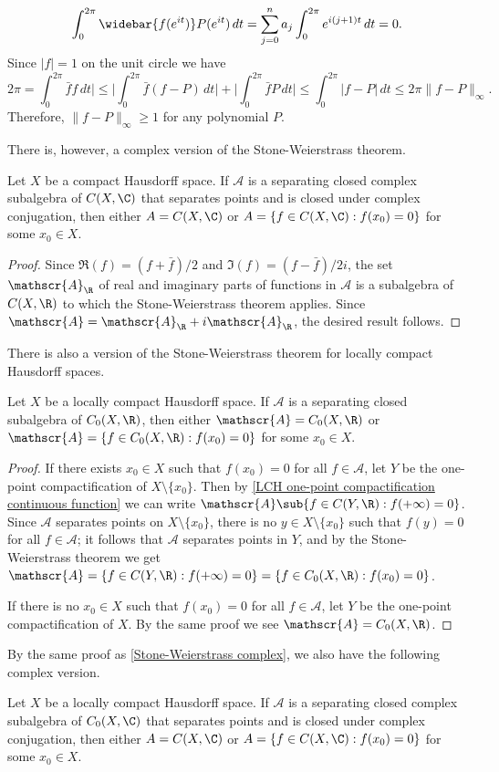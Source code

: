 \[\int_{0}^{2\pi}\widebar{f(e^{it})}P(e^{it})\,dt=\sum_{j=0}^{n}a_j\int_0^{2\pi}e^{i(j+1)t}\,dt=0.\]
Since $|f|=1$ on the unit circle we have
\[2\pi=\int_0^{2\pi}\bar{f}f\,dt\Big|\leq\Big|\int_0^{2\pi}\bar{f}(f-P)\,dt\Big|+\Big|\int_0^{2\pi}\bar{f}P\,dt\Big|\leq\int_0^{2\pi}|f-P|\,dt\leq 2\pi\|f-P\|_\infty.\]
Therefore, $\|f-P\|_\infty\geq 1$ for any polynomial $P$.\par
There is, however, a complex version of the Stone-Weierstrass theorem.
\begin{theorem}\label{Stone-Weierstrass complex}
Let $X$ be a compact Hausdorff space. If $\mathscr{A}$ is a separating closed complex subalgebra of $C(X,\C)$ that separates points and is closed under complex conjugation, then either $A=C(X,\C)$ or $A=\{f\in C(X,\C):f(x_0)=0\}$ for some $x_0\in X$.
\end{theorem}
\begin{proof}
Since $\Re(f)=(f+\bar{f})/2$ and $\Im(f)=(f-\bar{f})/2i$, the set $\mathscr{A}_{\R}$ of real and imaginary parts of functions in $\mathscr{A}$ is a subalgebra of $C(X,\R)$ to which the Stone-Weierstrass theorem applies. Since $\mathscr{A}=\mathscr{A}_{\R}+i\mathscr{A}_{\R}$, the desired result follows.
\end{proof}
There is also a version of the Stone-Weierstrass theorem for locally compact Hausdorff spaces.
\begin{theorem}
Let $X$ be a locally compact Hausdorff space. If $\mathscr{A}$ is a separating closed subalgebra of $C_0(X,\R)$, then either $\mathscr{A}=C_0(X,\R)$ or $\mathscr{A}=\{f\in C_0(X,\R):f(x_0)=0\}$ for some $x_0\in X$.
\end{theorem}
\begin{proof}
If there exists $x_0\in X$ such that $f(x_0)=0$ for all $f\in\mathscr{A}$, let $Y$ be the one-point compactification of $X\setminus\{x_0\}$. Then by \cref{LCH one-point compactification continuous function} we can write $\mathscr{A}\sub\{f\in C(Y,\R):f(+\infty)=0\}$. Since $\mathscr{A}$ separates points on $X\setminus\{x_0\}$, there is no $y\in X\setminus\{x_0\}$ such that $f(y)=0$ for all $f\in\mathscr{A}$; it follows that $\mathscr{A}$ separates points in $Y$, and by the Stone-Weierstrass theorem we get $\mathscr{A}=\{f\in C(Y,\R):f(+\infty)=0\}=\{f\in C_0(X,\R):f(x_0)=0\}$.\par
If there is no $x_0\in X$ such that $f(x_0)=0$ for all $f\in\mathscr{A}$, let $Y$ be the one-point compactification of $X$. By the same proof we see $\mathscr{A}=C_0(X,\R)$.
\end{proof}
By the same proof as \cref{Stone-Weierstrass complex}, we also have the following complex version.
\begin{theorem}
Let $X$ be a locally compact Hausdorff space. If $\mathscr{A}$ is a separating closed complex subalgebra of $C_0(X,\C)$ that separates points and is closed under complex conjugation, then either $A=C(X,\C)$ or $A=\{f\in C(X,\C):f(x_0)=0\}$ for some $x_0\in X$.
\end{theorem}
